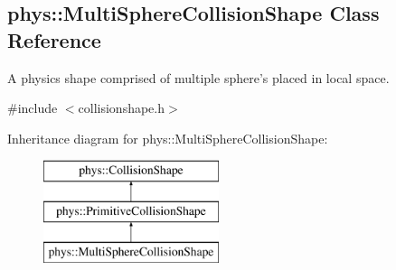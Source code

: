 \hypertarget{classphys_1_1MultiSphereCollisionShape}{
\subsection{phys::MultiSphereCollisionShape Class Reference}
\label{classphys_1_1MultiSphereCollisionShape}
}


A physics shape comprised of multiple sphere's placed in local space.  




{\ttfamily \#include $<$collisionshape.h$>$}

Inheritance diagram for phys::MultiSphereCollisionShape:\begin{figure}[H]
\begin{center}
\leavevmode
\includegraphics[height=3.000000cm]{classphys_1_1MultiSphereCollisionShape}
\end{center}
\end{figure}
